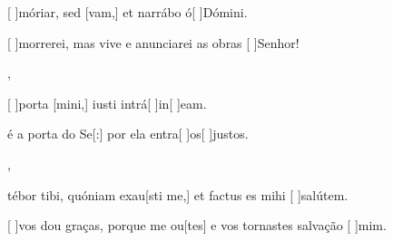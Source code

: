 {  %
  {\item {}[ ]{mó}riar, sed [vam,] et narrábo ó[ ]{Dó}mini.~\Antiphona}%
    {\item {}[ ]{mor}rerei, mas vive e anunciarei as obras [ ]{Se}{\-nhor}!~\Antiphona},
  {\item {}[ ]{por}ta [mini,] iusti intrá[ ]{in}[ ]{e}am.~\Antiphona}%
    {\item {} é a porta do Se[:] por ela entra[ ]{os}[ ]{jus}tos.~\Antiphona},
  {\item {}tébor tibi, quóniam exau[sti me,] et factus es mihi [ ]{sa}{lú}tem.~\Antiphona}%
    {\item {}[ ]{vos} dou graças, porque me ou[tes] e vos tornastes salvação [ ]{mim}.~\Antiphona}
}